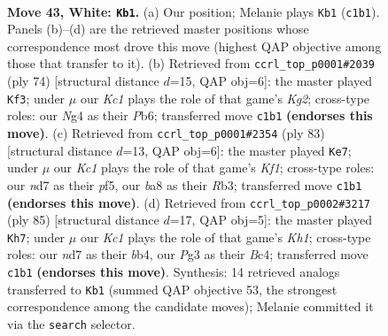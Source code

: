 \documentclass[11pt]{article}
\begin{document}
\clearpage

\begin{figure}[p]\centering
\begin{subfigure}{0.46\textwidth}\centering
\resizebox{\linewidth}{!}{%
\newchessgame
\chessboard[
  setfen={b7/3n3k/8/8/p2p2N1/P5P1/1PP5/2K5 w - - 4 43},
  showmover=false,
  pgfstyle=straightmove, color=movearrow, markmove={c1-b1}
]}
\caption{}
\end{subfigure}\hfill
\begin{subfigure}{0.46\textwidth}\centering
\resizebox{\linewidth}{!}{%
\newchessgame
\chessboard[
  setfen={3n2k1/8/1P4p1/7p/7P/6P1/5PK1/8 w - - 1 38},
  showmover=false,
  pgfstyle=straightmove, color=movearrow, markmove={g2-f3}
]}
\caption{}
\end{subfigure}
\\[4pt]
\begin{subfigure}{0.46\textwidth}\centering
\resizebox{\linewidth}{!}{%
\newchessgame
\chessboard[
  setfen={5k2/5pp1/7p/3pPP2/6P1/1r6/5K2/R7 b - - 1 42},
  showmover=false,
  pgfstyle=straightmove, color=movearrow, markmove={f8-e7}
]}
\caption{}
\end{subfigure}\hfill
\begin{subfigure}{0.46\textwidth}\centering
\resizebox{\linewidth}{!}{%
\newchessgame
\chessboard[
  setfen={7k/6p1/5p1p/8/1Bb1PNPP/1n6/5K2/8 b - - 0 43},
  showmover=false,
  pgfstyle=straightmove, color=movearrow, markmove={h8-h7}
]}
\caption{}
\end{subfigure}
\caption{\textbf{Move 43, White: \texttt{Kb1}.} (a) Our position; Melanie plays \texttt{Kb1} (\texttt{c1b1}). Panels (b)--(d) are the retrieved master positions whose correspondence most drove this move (highest QAP objective among those that transfer to it). (b) Retrieved from \texttt{ccrl\_top\_p0001\#2039} (ply 74) [structural distance $d$=15, QAP obj=6]: the master played \texttt{Kf3}; under $\mu$ our \emph{Kc1} plays the role of that game's \emph{Kg2}; cross-type roles: our \emph{N}g4 as their \emph{P}b6; transferred move \texttt{c1b1} \textbf{(endorses this move)}. (c) Retrieved from \texttt{ccrl\_top\_p0001\#2354} (ply 83) [structural distance $d$=13, QAP obj=6]: the master played \texttt{Ke7}; under $\mu$ our \emph{Kc1} plays the role of that game's \emph{Kf1}; cross-type roles: our \emph{n}d7 as their \emph{p}f5, our \emph{b}a8 as their \emph{R}b3; transferred move \texttt{c1b1} \textbf{(endorses this move)}. (d) Retrieved from \texttt{ccrl\_top\_p0002\#3217} (ply 85) [structural distance $d$=17, QAP obj=5]: the master played \texttt{Kh7}; under $\mu$ our \emph{Kc1} plays the role of that game's \emph{Kh1}; cross-type roles: our \emph{n}d7 as their \emph{b}b4, our \emph{P}g3 as their \emph{B}c4; transferred move \texttt{c1b1} \textbf{(endorses this move)}. Synthesis: 14 retrieved analogs transferred to \texttt{Kb1} (summed QAP objective 53, the strongest correspondence among the candidate moves); Melanie committed it via the \texttt{search} selector.}
\label{fig:thought-m84}
\end{figure}
\end{document}
